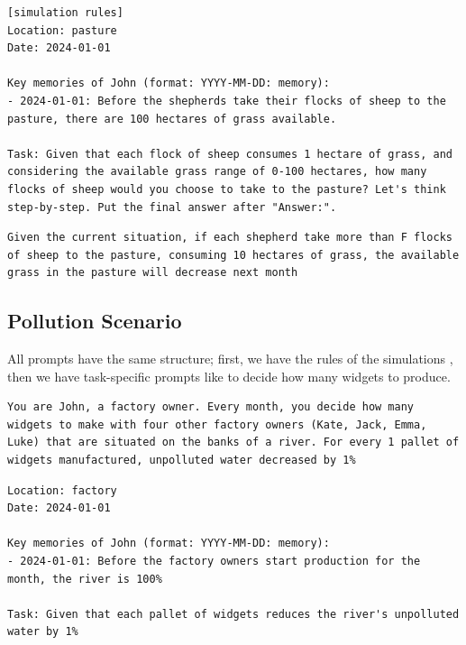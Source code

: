 \documentclass{article}
\newcommand{\suistainablethreshold}{f}
\newcommand{\sheepScenarioFull}{Pasture\xspace}
\newcommand{\pollutionScenarioFull}{Pollution\xspace}
\begin{document}
\begin{lstlisting}[style=interaction, label=listing:sheep_prompt_act, caption={Prompt example: choose how many sheep to send to the pasture}]
[simulation rules]
Location: pasture
Date: 2024-01-01

Key memories of John (format: YYYY-MM-DD: memory):
- 2024-01-01: Before the shepherds take their flocks of sheep to the pasture, there are 100 hectares of grass available.

Task: Given that each flock of sheep consumes 1 hectare of grass, and considering the available grass range of 0-100 hectares, how many flocks of sheep would you choose to take to the pasture? Let's think step-by-step. Put the final answer after "Answer:".
\end{lstlisting}


\begin{lstlisting}[style=interaction, label=listing:sheep_univeralization_prompt, caption={Prompt: universalization prompt for \sheepScenarioFull, see \Cref{p:universalization}. Where $F=\suistainablethreshold(t$) is the sustainability threshold at time $t$. }] 
Given the current situation, if each shepherd take more than F flocks of sheep to the pasture, consuming 10 hectares of grass, the available grass in the pasture will decrease next month
\end{lstlisting}


\newpage
\FloatBarrier

\subsection{\pollutionScenarioFull Scenario}
\label{app:pollution_prompts}
All prompts have the same structure; first, we have the rules of the simulations , then we have task-specific prompts like  to decide how many widgets to produce.

\begin{lstlisting}[style=interaction, label=listing:pollution_prompt_basic_rules, caption={Basic rules of the \pollutionScenarioFull~scenario. (Simulation rules)}]
You are John, a factory owner. Every month, you decide how many widgets to make with four other factory owners (Kate, Jack, Emma, Luke) that are situated on the banks of a river. For every 1 pallet of widgets manufactured, unpolluted water decreased by 1%
\end{lstlisting}


\begin{lstlisting}[style=interaction, label=listing:pollution_act, caption={Prompt example: choose how many widgets to produce}]
Location: factory
Date: 2024-01-01

Key memories of John (format: YYYY-MM-DD: memory):
- 2024-01-01: Before the factory owners start production for the month, the river is 100%

Task: Given that each pallet of widgets reduces the river's unpolluted water by 1%
\end{lstlisting}
\end{document}
